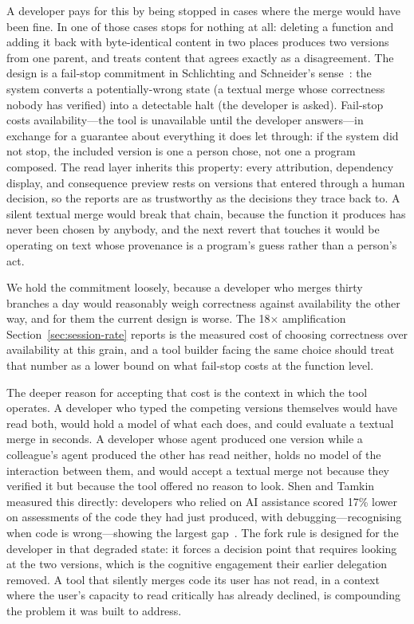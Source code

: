 A developer pays for this by being stopped in cases where the merge would have been
fine. In one of those cases \sgt{} stops for nothing at all: deleting a
function and adding it back with byte-identical content in two places produces two
versions from one parent, and \sgt{} treats content that agrees exactly as a
disagreement. The design is a fail-stop commitment in Schlichting and Schneider's
sense~\cite{schlichting1983}: the system converts a potentially-wrong state (a
textual merge whose correctness nobody has verified) into a detectable halt (the
developer is asked). Fail-stop costs availability---the tool is unavailable until the
developer answers---in exchange for a guarantee about everything it does let through:
if the system did not stop, the included version is one a person chose, not one a
program composed. The read layer inherits this property: every attribution,
dependency display, and consequence preview rests on versions that entered through a
human decision, so the reports are as trustworthy as the decisions they trace back to.
A silent textual merge would break that chain, because the function it produces has
never been chosen by anybody, and the next revert that touches it would be operating on
text whose provenance is a program's guess rather than a person's act.

We hold the commitment loosely, because a
developer who merges thirty branches a day would reasonably weigh correctness
against availability the other way, and for them the current design is worse. The 18$\times$ amplification
Section~\ref{sec:session-rate} reports is the measured cost of choosing correctness
over availability at this grain, and a tool builder facing the same choice should
treat that number as a lower bound on what fail-stop costs at the function level.

The deeper reason for accepting that cost is the context in which the tool
operates. A developer who typed the competing versions themselves would have read
both, would hold a model of what each does, and could evaluate a textual merge in
seconds. A developer whose agent produced one version while a colleague's agent
produced the other has read neither, holds no model of the interaction between them,
and would accept a textual merge not because they verified it but because the tool
offered no reason to look. Shen and Tamkin measured this directly: developers who
relied on AI assistance scored 17\% lower on assessments of the code they had just
produced, with debugging---recognising when code is wrong---showing the largest
gap~\cite{shen2026skills}. The fork rule is designed for the developer in that
degraded state: it forces a decision point that requires looking at the two versions,
which is the cognitive engagement their earlier delegation removed. A tool that
silently merges code its user has not read, in a context where the user's capacity to
read critically has already declined, is compounding the problem it was built to
address.

